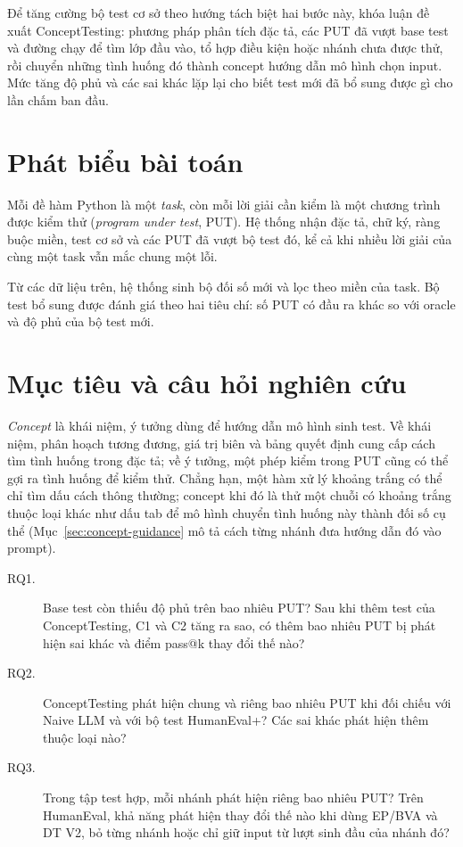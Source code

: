 Để tăng cường bộ test cơ sở theo hướng tách biệt hai bước này, khóa luận đề xuất ConceptTesting: phương pháp phân tích đặc tả, các PUT đã vượt base test và đường chạy để tìm lớp đầu vào, tổ hợp điều kiện hoặc nhánh chưa được thử, rồi chuyển những tình huống đó thành concept hướng dẫn mô hình chọn input. Mức tăng độ phủ và các sai khác lặp lại cho biết test mới đã bổ sung được gì cho lần chấm ban đầu.

\section*{Phát biểu bài toán}

Mỗi đề hàm Python là một \textit{task}, còn mỗi lời giải cần kiểm là một chương trình được kiểm thử (\textit{program under test}, PUT). Hệ thống nhận đặc tả, chữ ký, ràng buộc miền, test cơ sở và các PUT đã vượt bộ test đó, kể cả khi nhiều lời giải của cùng một task vẫn mắc chung một lỗi.

Từ các dữ liệu trên, hệ thống sinh bộ đối số mới và lọc theo miền của task. Bộ test bổ sung được đánh giá theo hai tiêu chí: số PUT có đầu ra khác so với oracle và độ phủ của bộ test mới.
\section*{Mục tiêu và câu hỏi nghiên cứu}

\textit{Concept} là khái niệm, ý tưởng dùng để hướng dẫn mô hình sinh test. Về khái niệm, phân hoạch tương đương, giá trị biên và bảng quyết định cung cấp cách tìm tình huống trong đặc tả; về ý tưởng, một phép kiểm trong PUT cũng có thể gợi ra tình huống để kiểm thử. Chẳng hạn, một hàm xử lý khoảng trắng có thể chỉ tìm dấu cách thông thường; concept khi đó là thử một chuỗi có khoảng trắng thuộc loại khác như dấu tab để mô hình chuyển tình huống này thành đối số cụ thể (Mục~\ref{sec:concept-guidance} mô tả cách từng nhánh đưa hướng dẫn đó vào prompt).

\begin{description}
\item[RQ1.] Base test còn thiếu độ phủ trên bao nhiêu PUT? Sau khi thêm test của ConceptTesting, C1 và C2 tăng ra sao, có thêm bao nhiêu PUT bị phát hiện sai khác và điểm pass@k thay đổi thế nào?
\item[RQ2.] ConceptTesting phát hiện chung và riêng bao nhiêu PUT khi đối chiếu với Naive LLM và với bộ test HumanEval+? Các sai khác phát hiện thêm thuộc loại nào?
\item[RQ3.] Trong tập test hợp, mỗi nhánh phát hiện riêng bao nhiêu PUT? Trên HumanEval, khả năng phát hiện thay đổi thế nào khi dùng EP/BVA và DT V2, bỏ từng nhánh hoặc chỉ giữ input từ lượt sinh đầu của nhánh đó?
\end{description}

